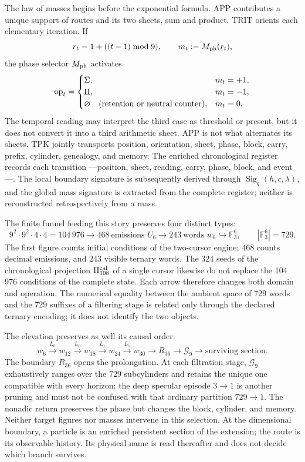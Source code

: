 The law of masses begins before the exponential formula. APP contributes a unique
support of routes and its two sheets, sum and product. TRIT orients each
elementary iteration.
If
\[
 r_t=1+((t-1)\bmod9),\qquad m_t:=M_{\rm ph}(r_t),
\]
the phase selector \(M_{\rm ph}\) activates
\[
 \operatorname{op}_t=
 \begin{cases}
  \Sigma,&m_t=+1,\\
  \Pi,&m_t=-1,\\
  \varnothing\quad(\text{\rm retention or neutral counter}),&m_t=0.
 \end{cases}
\]
The temporal reading may interpret the third case as threshold or present,
but it does not convert it into a third arithmetic sheet. APP is not what alternates
its sheets. TPK jointly transports
position, orientation, sheet, phase, block, carry, prefix,
cylinder, genealogy, and memory. The enriched chronological register records
each transition ---position,
sheet, reading, carry, phase, block, and event---. The local boundary signature
is subsequently derived through \(\operatorname{Sig}_q(h,c,\lambda)\), and the global
mass signature is extracted from the complete register; neither is reconstructed
retrospectively from a mass.

The finite funnel feeding this story preserves four distinct types:
\[
 9^2\!\cdot9^2\!\cdot4\!\cdot4=104\,976
 \longrightarrow 468\ \text{emissions }U_6
 \longrightarrow 243\ \text{words }w_6
 \hookrightarrow \mathbb F_3^6,
 \qquad |\mathbb F_3^6|=729.
\]
The first figure counts initial conditions of the two-cursor engine; 468
counts decimal emissions, and 243 visible ternary words. The 324 seeds
of the chronological projection \(\Pi_{108}^{\rm cal}\) of a single cursor
likewise do not replace the 104\,976
conditions of the complete state. Each arrow therefore changes both domain and
operation. The numerical equality between the ambient space of \(729\) words and the
\(729\) suffixes of a filtering stage is related only through the declared
ternary encoding; it does not identify the two objects.

The elevation preserves as well its causal order:
\[
 w_6\xrightarrow{\,L_0\,}w_{12}
 \xrightarrow{\,L_0\,}w_{18}
 \xrightarrow{\,L_1\,}w_{24}
 \xrightarrow{\,L_1\,}w_{30}
 \longrightarrow R_{36}\longrightarrow\mathcal G_9
 \longrightarrow
 \text{surviving section}.
\]
The boundary \(R_{36}\) opens the prolongation. At each filtration stage,
\(\mathcal G_9\) exhaustively ranges over
the 729 subcylinders and retains the unique one compatible with every horizon; the
deep specular episode \(3\to1\) is another pruning and must not be confused with
that ordinary partition \(729\to1\). The nonadic return preserves the phase
but changes the block, cylinder, and memory. Neither target figures nor masses intervene
in this selection. At the dimensional boundary, a particle is an enriched persistent
section of the extension; the route is its observable history.
Its physical name is read thereafter and does not decide which branch survives.

